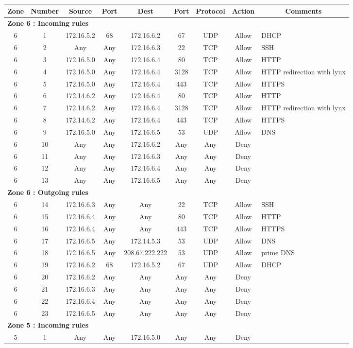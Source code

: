 \documentclass[a4paper,titlepage]{article}
\begin{document}
\begin{table}[h]
	\center
	\begin{tabular}{c|c|cc|cc|ccl}
		Zone & Number & Source & Port & Dest & Port & Protocol & Action & \multicolumn{1}{c}{Comments}\\
		\hline
		\multicolumn{9}{l}{\textbf{Zone 6 : Incoming rules}}\\
		6 & 1 & 172.16.5.2 & 68 & 172.16.6.2 & 67 & UDP & Allow & DHCP \\
		6 & 2 & Any & Any & 172.16.6.3 & 22 & TCP & Allow & SSH \\
		6 & 3 & 172.16.5.0 & Any & 172.16.6.4 & 80 & TCP & Allow & HTTP \\
		6 & 4 & 172.16.5.0 & Any & 172.16.6.4 & 3128 & TCP & Allow & HTTP redirection with lynx \\
		6 & 5 & 172.16.5.0 & Any & 172.16.6.4 & 443 & TCP & Allow & HTTPS \\
		6 & 6 & 172.14.6.2 & Any & 172.16.6.4 & 80 & TCP & Allow & HTTP \\
		6 & 7 & 172.14.6.2 & Any & 172.16.6.4 & 3128 & TCP & Allow & HTTP redirection with lynx  \\
		6 & 8 & 172.14.6.2 & Any & 172.16.6.4 & 443 & TCP & Allow & HTTPS \\
		6 & 9 & 172.16.5.0 & Any & 172.16.6.5 & 53 & UDP & Allow & DNS \\
		6 & 10 & Any & Any & 172.16.6.2 & Any & Any & Deny & \\
		6 & 11 & Any & Any & 172.16.6.3 & Any & Any & Deny & \\
		6 & 12 & Any & Any & 172.16.6.4 & Any & Any & Deny & \\
		6 & 13 & Any & Any & 172.16.6.5 & Any & Any & Deny & \\

		\hline
		\multicolumn{9}{l}{\textbf{Zone 6 : Outgoing rules}}\\

		6 & 14 & 172.16.6.3 & Any & Any & 22 & TCP & Allow & SSH\\
		6 & 15 & 172.16.6.4 & Any & Any & 80 & TCP & Allow & HTTP\\
		6 & 16 & 172.16.6.4 & Any & Any & 443 & TCP & Allow & HTTPS\\
		6 & 17 & 172.16.6.5 & Any & 172.14.5.3 & 53 & UDP & Allow & DNS \\
		6 & 18 & 172.16.6.5 & Any & 208.67.222.222 & 53 & UDP & Allow & prime DNS \\
		6 & 19 & 172.16.6.2 & 68 & 172.16.5.2 & 67 & UDP & Allow & DHCP \\
		6 & 20 & 172.16.6.2 & Any & Any & Any & Any & Deny & \\
		6 & 21 & 172.16.6.3 & Any & Any & Any & Any & Deny & \\
		6 & 22 & 172.16.6.4 & Any & Any & Any & Any & Deny & \\
		6 & 23 & 172.16.6.5 & Any & Any & Any & Any & Deny & \\
		\hline
		\multicolumn{9}{l}{\textbf{Zone 5 : Incoming rules}}\\
		5 & 1 & Any & Any & 172.16.5.0 & Any & Any & Deny & \\


\end{tabular}
\end{table}
\end{document}
